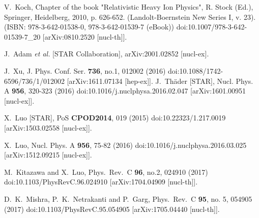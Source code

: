 \begin{thebibliography}{99}
  V.~Koch,  %
  Chapter of the book "Relativistic Heavy Ion Physics", R. Stock (Ed.), Springer, Heidelberg, 2010, p. 626-652. (Landolt-Boernstein New Series I, v. 23). (ISBN: 978-3-642-01538-0, 978-3-642-01539-7 (eBook))
  doi:10.1007/978-3-642-01539-7\_20
  [arXiv:0810.2520 [nucl-th]].

  J.~Adam {\it et al.} [STAR Collaboration],
  arXiv:2001.02852 [nucl-ex].

J.~Xu,
J. Phys. Conf. Ser. \textbf{736}, no.1, 012002 (2016)
doi:10.1088/1742-6596/736/1/012002
[arXiv:1611.07134 [hep-ex]].
J.~Thäder [STAR],
Nucl. Phys. A \textbf{956}, 320-323 (2016)
doi:10.1016/j.nuclphysa.2016.02.047
[arXiv:1601.00951 [nucl-ex]].

X.~Luo [STAR],
PoS \textbf{CPOD2014}, 019 (2015)
doi:10.22323/1.217.0019
[arXiv:1503.02558 [nucl-ex]].

X.~Luo,
Nucl. Phys. A \textbf{956}, 75-82 (2016)
doi:10.1016/j.nuclphysa.2016.03.025
[arXiv:1512.09215 [nucl-ex]].


M.~Kitazawa and X.~Luo,
Phys.\ Rev.\ C \textbf{96}, no.2, 024910 (2017)
doi:10.1103/PhysRevC.96.024910
[arXiv:1704.04909 [nucl-th]].


  D.~K.~Mishra, P.~K.~Netrakanti and P.~Garg,
  Phys.\ Rev.\ C {\bf 95}, no. 5, 054905 (2017)
  doi:10.1103/PhysRevC.95.054905
  [arXiv:1705.04440 [nucl-th]].


\end{thebibliography}
